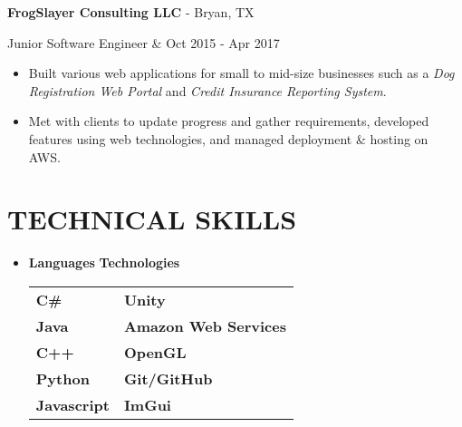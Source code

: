 \documentclass[resmargin,10pt]{res} %
\begin{document}
\begin{resume}
				{\bf FrogSlayer Consulting LLC} - Bryan, TX \\ 
                \begin{ncolumn}{2} %
                Junior Software Engineer &  \hfill Oct 2015 - Apr 2017
                \end{ncolumn}
                \begin{itemize}           
                \item  Built various web applications for small to mid-size businesses such as a \textit{Dog Registration Web Portal} and \textit{Credit Insurance Reporting System}.
                \item Met with clients to update progress and gather requirements, developed features using web technologies, and managed deployment \& hosting on AWS.
                \end{itemize}
                    
\section{TECHNICAL SKILLS}	
							\begin{itemize}
                    		\item[] 
\textbf{\large Languages}  \hspace*{.5in} \textbf{\large Technologies}        \\
\begin{tabular}{ll}
\textbf{C\#} \hspace*{1in}  & \textbf{Unity} \\
\textbf{Java} & \textbf{Amazon Web Services} \\
\textbf{C++}   & \textbf{OpenGL}       \\
\textbf{Python}  & \textbf{Git/GitHub}               \\
\textbf{Javascript} & \textbf{ImGui}               \\
\end{tabular}
                    		\end{itemize} 

\end{resume}
\end{document}
